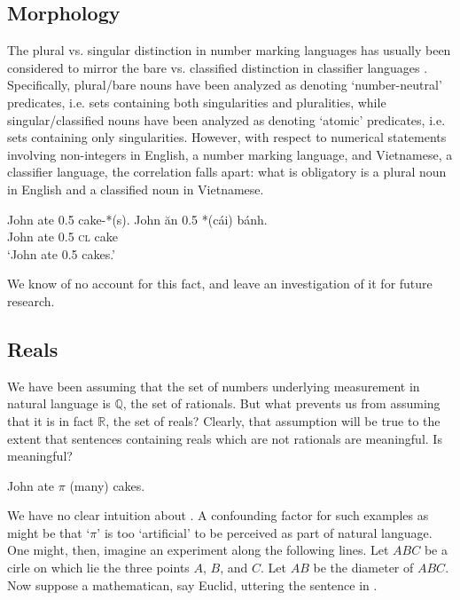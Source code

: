 \documentclass[output=paper]{langscibook}
\begin{document}
\subsection{Morphology} 

The plural vs. singular distinction in number marking languages has usually been considered to mirror the bare vs. classified distinction in classifier languages \citep[cf.][]{Chierchia:1998, cheng1999bare}. Specifically, plural/bare nouns have been analyzed as denoting `number-neutral' predicates, i.e. sets containing both singularities and pluralities, while singular/classified nouns have been analyzed as denoting `atomic' predicates, i.e. sets containing only singularities. However, with respect to numerical statements involving non-integers in English, a number marking language, and Vietnamese, a classifier language, the correlation falls apart: what is obligatory is a plural noun in English and a classified noun in Vietnamese.

\ea
\ea John ate 0.5 cake-*(s).
\ex \gll John ăn 0.5 *(cái) bánh.\\
         John ate 0.5 \textsc{cl} cake\\
    \glt `John ate 0.5 cakes.'     
\z
\z

\noindent We know of no account for this fact, and leave an investigation of it for future research. %

\subsection{Reals}\label{hai-tri:sec:reals}

We have been assuming that the set of numbers underlying measurement in natural language is $\mathbb{Q}$, the set of rationals. But what prevents us from assuming that it is in fact $\mathbb{R}$, the set of reals? Clearly, that assumption will be true to the extent that sentences containing reals which are not rationals are meaningful. Is  meaningful?

\ea
John ate $\pi$ (many) cakes.
\label{hai-tri:pi}
\z

\noindent We have no clear intuition about . A confounding factor for such examples as  might be that `$\pi$' is too `artificial' to be perceived as part of natural language. One might, then, imagine an experiment along the following lines. Let $ABC$ be a cirle on which lie the three points $A$, $B$, and $C$. Let $AB$ be the diameter of $ABC$. Now suppose a mathematican, say Euclid, uttering the sentence in .
\end{document}
